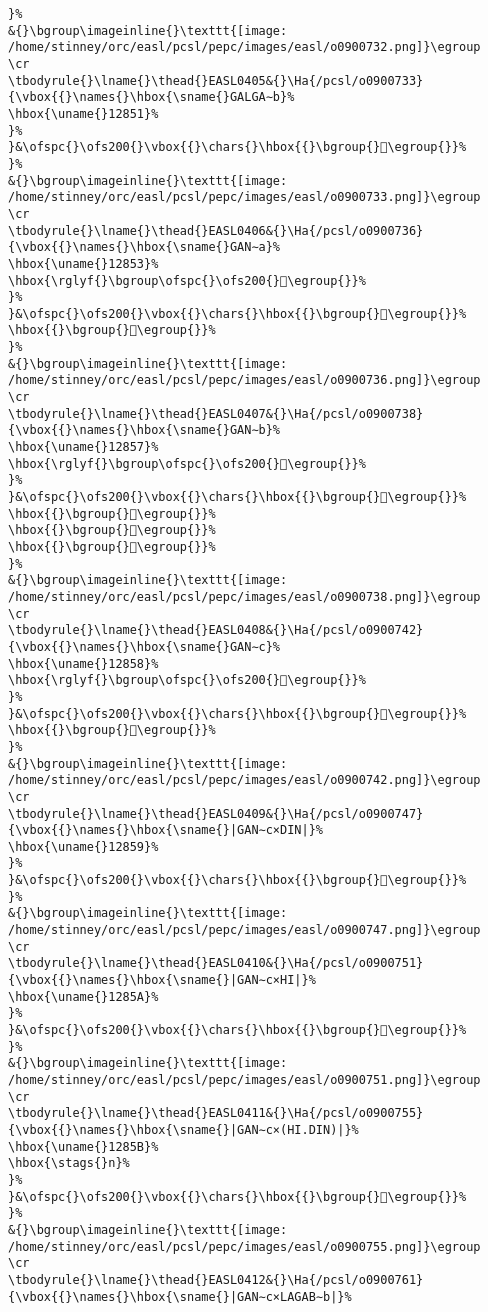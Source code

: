 \begin{verbatim}
}%
&{}\bgroup\imageinline{}\texttt{[image: /home/stinney/orc/easl/pcsl/pepc/images/easl/o0900732.png]}\egroup
\cr
\tbodyrule{}\lname{}\thead{}EASL0405&{}\Ha{/pcsl/o0900733}{\vbox{{}\names{}\hbox{\sname{}GALGA∼b}%
\hbox{\uname{}12851}%
}%
}&\ofspc{}\ofs200{}\vbox{{}\chars{}\hbox{{}\bgroup{}𒡑\egroup{}}%
}%
&{}\bgroup\imageinline{}\texttt{[image: /home/stinney/orc/easl/pcsl/pepc/images/easl/o0900733.png]}\egroup
\cr
\tbodyrule{}\lname{}\thead{}EASL0406&{}\Ha{/pcsl/o0900736}{\vbox{{}\names{}\hbox{\sname{}GAN∼a}%
\hbox{\uname{}12853}%
\hbox{\rglyf{}\bgroup\ofspc{}\ofs200{}𒡓\egroup{}}%
}%
}&\ofspc{}\ofs200{}\vbox{{}\chars{}\hbox{{}\bgroup{}𒡒\egroup{}}%
\hbox{{}\bgroup{}𒡓\egroup{}}%
}%
&{}\bgroup\imageinline{}\texttt{[image: /home/stinney/orc/easl/pcsl/pepc/images/easl/o0900736.png]}\egroup
\cr
\tbodyrule{}\lname{}\thead{}EASL0407&{}\Ha{/pcsl/o0900738}{\vbox{{}\names{}\hbox{\sname{}GAN∼b}%
\hbox{\uname{}12857}%
\hbox{\rglyf{}\bgroup\ofspc{}\ofs200{}𒡗\egroup{}}%
}%
}&\ofspc{}\ofs200{}\vbox{{}\chars{}\hbox{{}\bgroup{}𒡔\egroup{}}%
\hbox{{}\bgroup{}𒡕\egroup{}}%
\hbox{{}\bgroup{}𒡖\egroup{}}%
\hbox{{}\bgroup{}𒡗\egroup{}}%
}%
&{}\bgroup\imageinline{}\texttt{[image: /home/stinney/orc/easl/pcsl/pepc/images/easl/o0900738.png]}\egroup
\cr
\tbodyrule{}\lname{}\thead{}EASL0408&{}\Ha{/pcsl/o0900742}{\vbox{{}\names{}\hbox{\sname{}GAN∼c}%
\hbox{\uname{}12858}%
\hbox{\rglyf{}\bgroup\ofspc{}\ofs200{}𒡘\egroup{}}%
}%
}&\ofspc{}\ofs200{}\vbox{{}\chars{}\hbox{{}\bgroup{}𒡘\egroup{}}%
\hbox{{}\bgroup{}𒡠\egroup{}}%
}%
&{}\bgroup\imageinline{}\texttt{[image: /home/stinney/orc/easl/pcsl/pepc/images/easl/o0900742.png]}\egroup
\cr
\tbodyrule{}\lname{}\thead{}EASL0409&{}\Ha{/pcsl/o0900747}{\vbox{{}\names{}\hbox{\sname{}|GAN∼c×DIN|}%
\hbox{\uname{}12859}%
}%
}&\ofspc{}\ofs200{}\vbox{{}\chars{}\hbox{{}\bgroup{}𒡙\egroup{}}%
}%
&{}\bgroup\imageinline{}\texttt{[image: /home/stinney/orc/easl/pcsl/pepc/images/easl/o0900747.png]}\egroup
\cr
\tbodyrule{}\lname{}\thead{}EASL0410&{}\Ha{/pcsl/o0900751}{\vbox{{}\names{}\hbox{\sname{}|GAN∼c×HI|}%
\hbox{\uname{}1285A}%
}%
}&\ofspc{}\ofs200{}\vbox{{}\chars{}\hbox{{}\bgroup{}𒡚\egroup{}}%
}%
&{}\bgroup\imageinline{}\texttt{[image: /home/stinney/orc/easl/pcsl/pepc/images/easl/o0900751.png]}\egroup
\cr
\tbodyrule{}\lname{}\thead{}EASL0411&{}\Ha{/pcsl/o0900755}{\vbox{{}\names{}\hbox{\sname{}|GAN∼c×(HI.DIN)|}%
\hbox{\uname{}1285B}%
\hbox{\stags{}n}%
}%
}&\ofspc{}\ofs200{}\vbox{{}\chars{}\hbox{{}\bgroup{}𒡛\egroup{}}%
}%
&{}\bgroup\imageinline{}\texttt{[image: /home/stinney/orc/easl/pcsl/pepc/images/easl/o0900755.png]}\egroup
\cr
\tbodyrule{}\lname{}\thead{}EASL0412&{}\Ha{/pcsl/o0900761}{\vbox{{}\names{}\hbox{\sname{}|GAN∼c×LAGAB∼b|}%

\end{verbatim}
